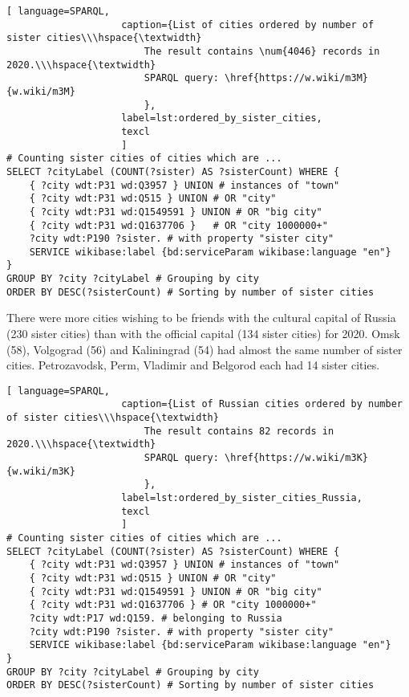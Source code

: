 \begin{lstlisting}[ language=SPARQL, 
                    caption={List of cities ordered by number of sister cities\\\hspace{\textwidth}
                        The result contains \num{4046} records in 2020.\\\hspace{\textwidth}
                        SPARQL query: \href{https://w.wiki/m3M}{w.wiki/m3M}
                        },
                    label=lst:ordered_by_sister_cities,
                    texcl 
                    ]
# Counting sister cities of cities which are ...
SELECT ?cityLabel (COUNT(?sister) AS ?sisterCount) WHERE {           
	{ ?city wdt:P31 wd:Q3957 } UNION # instances of "town"
	{ ?city wdt:P31 wd:Q515 } UNION # OR "city"
	{ ?city wdt:P31 wd:Q1549591 } UNION # OR "big city"
	{ ?city wdt:P31 wd:Q1637706 }	# OR "city 1000000+"
	?city wdt:P190 ?sister. # with property "sister city"
	SERVICE wikibase:label {bd:serviceParam wikibase:language "en"}
}
GROUP BY ?city ?cityLabel # Grouping by city                                   
ORDER BY DESC(?sisterCount) # Sorting by number of sister cities
\end{lstlisting}%


There were more cities wishing to be friends with the cultural capital of Russia (230 sister cities) than with the official capital (134 sister cities) for 2020. Omsk (58), Volgograd (56) and Kaliningrad (54) had almost the same number of sister cities. Petrozavodsk, Perm, Vladimir and Belgorod each had 14 sister cities.

\begin{lstlisting}[ language=SPARQL, 
                    caption={List of Russian cities ordered by number of sister cities\\\hspace{\textwidth}
                        The result contains 82 records in 2020.\\\hspace{\textwidth}
                        SPARQL query: \href{https://w.wiki/m3K}{w.wiki/m3K}
                        },
                    label=lst:ordered_by_sister_cities_Russia,
                    texcl 
                    ]
# Counting sister cities of cities which are ...
SELECT ?cityLabel (COUNT(?sister) AS ?sisterCount) WHERE {           
	{ ?city wdt:P31 wd:Q3957 } UNION # instances of "town"
	{ ?city wdt:P31 wd:Q515 } UNION # OR "city"
	{ ?city wdt:P31 wd:Q1549591 } UNION # OR "big city"
	{ ?city wdt:P31 wd:Q1637706 } # OR "city 1000000+"      
	?city wdt:P17 wd:Q159. # belonging to Russia
	?city wdt:P190 ?sister. # with property "sister city"
	SERVICE wikibase:label {bd:serviceParam wikibase:language "en"}
}
GROUP BY ?city ?cityLabel # Grouping by city
ORDER BY DESC(?sisterCount) # Sorting by number of sister cities
\end{lstlisting}%

